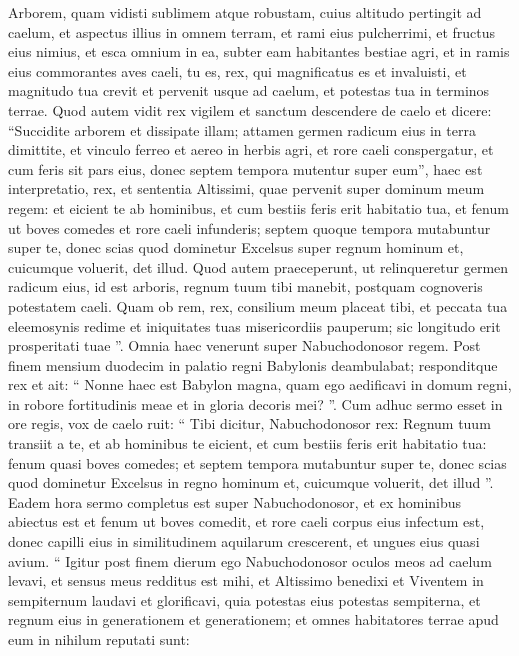 \begin{biblechapter}
\begin{biblechapter}
\begin{biblechapter}
\begin{biblechapter}
\verse Arborem, quam vidisti sublimem atque robustam, cuius altitudo pertingit ad caelum, et aspectus illius in omnem terram, 
\verse et rami eius pulcherrimi, et fructus eius nimius, et esca omnium in ea, subter eam habitantes bestiae agri, et in ramis eius commorantes aves caeli, 
\verse tu es, rex, qui magnificatus es et invaluisti, et magnitudo tua crevit et pervenit usque ad caelum, et potestas tua in terminos terrae. 
\verse Quod autem vidit rex vigilem et sanctum descendere de caelo et dicere: “Succidite arborem et dissipate illam; attamen germen radicum eius in terra dimittite, et vinculo ferreo et aereo in herbis agri, et rore caeli conspergatur, et cum feris sit pars eius, donec septem tempora mutentur super eum”, 
\verse haec est interpretatio, rex, et sententia Altissimi, quae pervenit super dominum meum regem: 
\verse et eicient te ab hominibus, et cum bestiis feris erit habitatio tua, et fenum ut boves comedes et rore caeli infunderis; septem quoque tempora mutabuntur super te, donec scias quod dominetur Excelsus super regnum hominum et, cuicumque voluerit, det illud. 
\verse Quod autem praeceperunt, ut relinqueretur germen radicum eius, id est arboris, regnum tuum tibi manebit, postquam cognoveris potestatem caeli. 
 \verse Quam ob rem, rex, consilium meum placeat tibi, et peccata tua eleemosynis redime et iniquitates tuas misericordiis pauperum; sic longitudo erit prosperitati tuae ”.
 \verse Omnia haec venerunt super Nabuchodonosor regem. 
\verse Post finem mensium duodecim in palatio regni Babylonis deambulabat; 
\verse responditque rex et ait: “ Nonne haec est Babylon magna, quam ego aedificavi in domum regni, in robore fortitudinis meae et in gloria decoris mei? ”. 
\verse Cum adhuc sermo esset in ore regis, vox de caelo ruit: “ Tibi dicitur, Nabuchodonosor rex: Regnum tuum transiit a te, 
\verse et ab hominibus te eicient, et cum bestiis feris erit habitatio tua: fenum quasi boves comedes; et septem tempora mutabuntur super te, donec scias quod dominetur Excelsus in regno hominum et, cuicumque voluerit, det illud ”. 
\verse Eadem hora sermo completus est super Nabuchodonosor, et ex hominibus abiectus est et fenum ut boves comedit, et rore caeli corpus eius infectum est, donec capilli eius in similitudinem aquilarum crescerent, et ungues eius quasi avium.
 \verse “ Igitur post finem dierum ego Nabuchodonosor oculos meos ad caelum levavi, et sensus meus redditus est mihi, et Altissimo benedixi et Viventem in sempiternum laudavi et glorificavi,
 quia potestas eius potestas sempiterna,
 et regnum eius in generationem et generationem;
 \verse et omnes habitatores terrae apud eum in nihilum reputati sunt:

\end{biblechapter}
\end{biblechapter}
\end{biblechapter}
\end{biblechapter}

